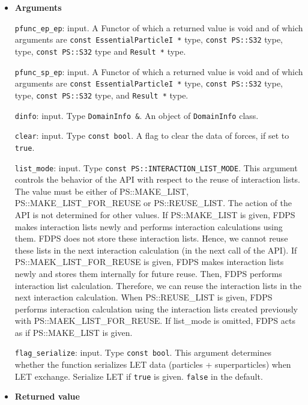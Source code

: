 \begin{itemize}

\item {\bf Arguments}

{\tt pfunc\_ep\_ep}: input. A Functor of which a returned value is
void and of which arguments are {\tt const EssentialParticleI *} type, {\tt const PS::S32} type,  type, {\tt const PS::S32} type and {\tt Result *} type.

{\tt pfunc\_sp\_ep}: input. A Functor of which a returned value is
void and of which arguments are {\tt const EssentialParticleI *} type, {\tt const PS::S32} type,  type, {\tt const PS::S32} type, and {\tt Result *} type.

{\tt dinfo}: input. Type {\tt DomainInfo \&}. An object of {\tt DomainInfo} class.

{\tt clear}: input. Type {\tt const bool}. A flag to clear the data of forces, if set to {\tt true}.

{\tt list\_mode}: input. Type {\tt const PS::INTERACTION\_LIST\_MODE}. This argument controls the behavior of the API with respect to the reuse of interaction lists. The value must be either of PS::MAKE\_LIST, PS::MAKE\_LIST\_FOR\_REUSE or PS::REUSE\_LIST. The action of the API is not determined for other values. If PS::MAKE\_LIST is given, FDPS makes interaction lists newly and performs interaction calculations using them. FDPS does not store these interaction lists. Hence, we cannot reuse these lists in the next interaction calculation (in the next call of the API). If PS::MAEK\_LIST\_FOR\_REUSE is given, FDPS makes interaction lists newly and stores them internally for future reuse. Then, FDPS performs interaction list calculation. Therefore, we can reuse the interaction lists in the next interaction calculation. When PS::REUSE\_LIST is given, FDPS performs interaction calculation using the interaction lists created previously with PS::MAEK\_LIST\_FOR\_REUSE. If list\_mode is omitted, FDPS acts as if PS::MAKE\_LIST is given.

\texttt{flag\_serialize}: input. Type \texttt{const bool}. This argument determines whether the function serializes LET data  (particles + superparticles) when LET exchange. Serialize LET if \texttt{true} is given. \texttt{false} in the default.

\item {\bf Returned value}


\end{itemize}
